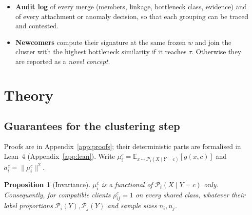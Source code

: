 \documentclass[pdflatex,sn-apa]{sn-jnl}
\theoremstyle{thmstyleone}
\newtheorem{proposition}{Proposition}
\theoremstyle{thmstylethree}
\newcommand{\E}{\mathbb{E}}
\newcommand{\cP}{\mathcal{P}}
\begin{document}
\begin{itemize}[leftmargin=*,itemsep=1pt]
where $\bar s_i$ is the mean of the leave-one-out values and $s^{A}_{iM},s^{B}_{iM}$ use only half $A$ or half $B$ of client $i$, disattenuated with the split-half reliability $r_i^c$. In simulations with known population similarity on a grid of 144 settings (10--200 samples per half, 3--12 cluster members, 2--20 classes, same and different concepts; Table~\ref{tab:certgrid} in Appendix~\ref{app:more}), the standard error has the right scale: the standard deviation of $s_{iM}$ over draws is $0.8$--$1.5$ times the mean standard error in every setting. For a client of the same concept, however, the minimum over classes is biased downwards, by $1.6$ standard errors with two classes and $3.3$ with twenty, so the nominal $\pm2\,\mathrm{se}$ interval covers the population value in only about $30\%$ of draws (about $89\%$ after removing the bias). For a client of a different concept the bias is small and the coverage is about $80\%$, because the standard error is about $15\%$ too small. The verdict \emph{confident} is therefore conservative on the own-cluster side. The same bias makes the test $s_{\rm oth}+z\,\mathrm{se}_{\rm oth}<\tau$ on the other-cluster side easier to pass, i.e.\ anti-conservative. We do not claim nominal coverage; we report how often confident certificates are correct (Section~\ref{sec:exp}). Standard errors are conditional on the reference model $w$.
\item \textbf{Audit log} of every merge (members, linkage, bottleneck class, evidence) and of every attachment or anomaly decision, so that each grouping can be traced and contested.
\item \textbf{Newcomers} compute their signature at the same frozen $w$ and join the cluster with the highest bottleneck similarity if it reaches $\tau$. Otherwise they are reported as a \emph{novel concept}.
\end{itemize}

\section{Theory}\label{sec:theory}
\subsection{Guarantees for the clustering step}
Proofs are in Appendix~\ref{app:proofs}; their deterministic parts are formalised in Lean~4 (Appendix~\ref{app:lean}). Write $\mu_i^c=\E_{x\sim\cP_i(X\mid Y=c)}[g(x,c)]$ and $a_i^c=\|\mu_i^c\|^2$.

\begin{proposition}[Invariance]\label{prop:inv}
$\mu_i^c$ is a functional of $\cP_i(X\mid Y=c)$ only. Consequently, for compatible clients $\rho^c_{ij}=1$ on every shared class, whatever their label proportions $\cP_i(Y),\cP_j(Y)$ and sample sizes $n_i,n_j$.
\end{proposition}
\end{document}
